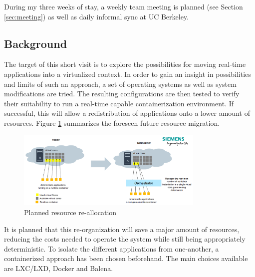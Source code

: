 \documentclass[]{scrartcl}
\begin{document}
During my three weeks of stay, a weekly team meeting is planned (see Section \ref{sec:meeting}) as well as daily informal sync at UC Berkeley.

\subsection{Background}


The target of this short visit is to explore the possibilities for moving real-time applications into a virtualized context. In order to gain an insight in possibilities and limits of such an approach, a set of operating systems as well as system modifications are tried.
The resulting configurations are then tested to verify their suitability to run a real-time capable containerization environment. If successful, this will allow a redistribution of applications onto a lower amount of resources. Figure \ref{fig:plan} summarizes the foreseen future resource migration. %

\begin{figure}
	\centering
	\includegraphics[width=0.8\textwidth]{plan}
	\caption{Planned resource re-allocation}
	\label{fig:plan}
\end{figure}

It is planned that this re-organization will save a major amount of resources, reducing the costs needed to operate the system while still being appropriately deterministic. To isolate the different applications from one-another, a containerized approach has been chosen beforehand. The main choices available are LXC/LXD, Docker and Balena.
\end{document}
